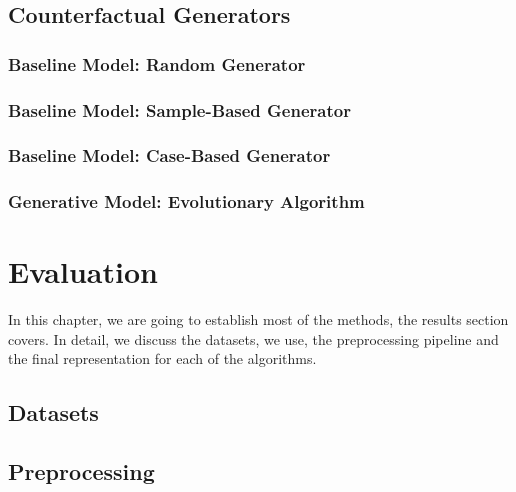 \documentclass[12pt,a4paper]{report}
\begin{document}
\section{Counterfactual Generators}
\label{sec:model_generation}
\subsection{Baseline Model: Random Generator}


\subsection{Baseline Model: Sample-Based Generator}


\subsection{Baseline Model: Case-Based Generator}


\subsection{Generative Model: Evolutionary Algorithm}
\label{sec:model_evolutionary}


\chapter{Evaluation}
\label{ch:evaluation}
In this chapter, we are going to establish most of the methods, the results section covers. In detail, we discuss the datasets, we use, the preprocessing pipeline and the final representation for each of the algorithms.


\section{Datasets}
\label{sec:dataset_description}

% 
% 


\section{Preprocessing}
\label{sec:preprocessing}

\end{document}
